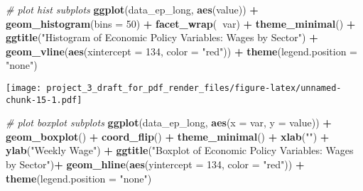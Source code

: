 \documentclass[]{article}
\newenvironment{Shaded}{\begin{snugshade}}{\end{snugshade}}
\newcommand{\CommentTok}[1]{\textcolor[rgb]{0.56,0.35,0.01}{\textit{#1}}}
\newcommand{\DataTypeTok}[1]{\textcolor[rgb]{0.13,0.29,0.53}{#1}}
\newcommand{\DecValTok}[1]{\textcolor[rgb]{0.00,0.00,0.81}{#1}}
\newcommand{\KeywordTok}[1]{\textcolor[rgb]{0.13,0.29,0.53}{\textbf{#1}}}
\newcommand{\NormalTok}[1]{#1}
\newcommand{\OperatorTok}[1]{\textcolor[rgb]{0.81,0.36,0.00}{\textbf{#1}}}
\newcommand{\StringTok}[1]{\textcolor[rgb]{0.31,0.60,0.02}{#1}}
\begin{document}
\begin{Shaded}
\begin{Highlighting}[]
\CommentTok{# plot hist subplots}
\KeywordTok{ggplot}\NormalTok{(data_ep_long, }\KeywordTok{aes}\NormalTok{(value)) }\OperatorTok{+}
\StringTok{  }\KeywordTok{geom_histogram}\NormalTok{(}\DataTypeTok{bins =} \DecValTok{50}\NormalTok{) }\OperatorTok{+}
\StringTok{  }\KeywordTok{facet_wrap}\NormalTok{(}\OperatorTok{~}\NormalTok{var) }\OperatorTok{+}
\StringTok{  }\KeywordTok{theme_minimal}\NormalTok{() }\OperatorTok{+}
\StringTok{  }\KeywordTok{ggtitle}\NormalTok{(}\StringTok{"Histogram of Economic Policy Variables: Wages by Sector"}\NormalTok{) }\OperatorTok{+}
\StringTok{  }\KeywordTok{geom_vline}\NormalTok{(}\KeywordTok{aes}\NormalTok{(}\DataTypeTok{xintercept =} \DecValTok{134}\NormalTok{, }\DataTypeTok{color =} \StringTok{"red"}\NormalTok{)) }\OperatorTok{+}
\StringTok{  }\KeywordTok{theme}\NormalTok{(}\DataTypeTok{legend.position =} \StringTok{"none"}\NormalTok{)}
\end{Highlighting}
\end{Shaded}

\texttt{[image: project\_3\_draft\_for\_pdf\_render\_files/figure-latex/unnamed-chunk-15-1.pdf]}

\begin{Shaded}
\begin{Highlighting}[]
\CommentTok{# plot boxplot subplots }
\KeywordTok{ggplot}\NormalTok{(data_ep_long, }\KeywordTok{aes}\NormalTok{(}\DataTypeTok{x =}\NormalTok{ var, }\DataTypeTok{y =}\NormalTok{ value)) }\OperatorTok{+}
\StringTok{  }\KeywordTok{geom_boxplot}\NormalTok{() }\OperatorTok{+}
\StringTok{  }\KeywordTok{coord_flip}\NormalTok{() }\OperatorTok{+}\StringTok{ }
\StringTok{  }\KeywordTok{theme_minimal}\NormalTok{() }\OperatorTok{+}
\StringTok{  }\KeywordTok{xlab}\NormalTok{(}\StringTok{""}\NormalTok{) }\OperatorTok{+}\StringTok{ }
\StringTok{  }\KeywordTok{ylab}\NormalTok{(}\StringTok{"Weekly Wage"}\NormalTok{) }\OperatorTok{+}
\StringTok{  }\KeywordTok{ggtitle}\NormalTok{(}\StringTok{"Boxplot of Economic Policy Variables: Wages by Sector"}\NormalTok{)}\OperatorTok{+}
\StringTok{  }\KeywordTok{geom_hline}\NormalTok{(}\KeywordTok{aes}\NormalTok{(}\DataTypeTok{yintercept =} \DecValTok{134}\NormalTok{, }\DataTypeTok{color =} \StringTok{"red"}\NormalTok{)) }\OperatorTok{+}
\StringTok{  }\KeywordTok{theme}\NormalTok{(}\DataTypeTok{legend.position =} \StringTok{"none"}\NormalTok{)}
\end{Highlighting}
\end{Shaded}
\end{document}

